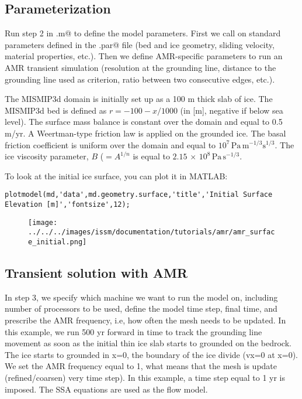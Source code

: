 \subsection{Parameterization}
Run step 2 in \verb@runme.m@ to define the model parameters. First we call on standard parameters defined in the \verb@mismip.par@ file (bed and ice geometry, sliding velocity, material properties, etc.). Then we define AMR-specific parameters to run an AMR transient simulation (resolution at the grounding line, distance to the grounding line used as criterion, ratio between two consecutive edges, etc.).

The MISMIP3d domain is initially set up as a 100 m thick slab of ice. The MISMIP3d bed is defined as $r=-100-x/1000$ (in [m], negative if below sea level). The surface mass balance is constant over the domain and equal to 0.5 m/yr. A Weertman-type friction law is applied on the grounded ice. The basal friction coefficient is uniform over the domain and equal to $10^{7}\,\textrm{Pa}\,\textrm{m}^{-1/3}\textrm{s}^{1/3}$. The ice viscosity parameter, $B$ ($=A^{1/n}$ is equal to $2.15 \, \times \, 10^{8}\,\textrm{Pa}\,\textrm{s}^{-1/3}$.

To look at the initial ice surface, you can plot it in MATLAB:
\begin{verbatim}plotmodel(md,'data',md.geometry.surface,'title','Initial Surface Elevation [m]','fontsize',12);\end{verbatim}

\begin{figure}[H]
	\begin{center}
		\texttt{[image: ../../../images/issm/documentation/tutorials/amr/amr\_surface\_initial.png]}
	\end{center}
\end{figure}

\subsection{Transient solution with AMR}
In step 3, we specify which machine we want to run the model on, including number of processors to be used, define the model time step, final time, and prescribe the AMR frequency, i.e, how often the mesh needs to be updated. In this example, we run 500 yr forward in time to track the grounding line movement as soon as the initial thin ice slab starts to grounded on the bedrock. The ice starts to grounded in x=0, the boundary of the ice divide (vx=0 at x=0). We set the AMR frequency equal to 1, what means that the mesh is update (refined/coarsen) very time step). In this example, a time step equal to 1 yr is imposed. The SSA equations are used as the flow model.


